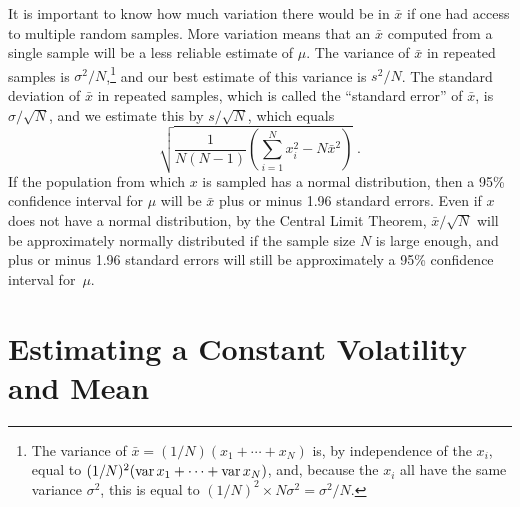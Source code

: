 It is important to know how much variation there would be in $\bar{x}$ if one had access to multiple random samples.  More variation means that an $\bar{x}$ computed from a single sample will be a less reliable estimate of $\mu$.  The variance of $\bar{x}$ in repeated samples is $\sigma^2/N$,\footnote{The variance of $\bar{x} = (1/N)(x_1 + \cdots + x_N)$ is, by independence of the $x_i$, equal to $(1/N)^2(\operatorname{var}{x_1} + \cdots + \operatorname{var}{x_N})$, and, because the $x_i$ all have the same variance $\sigma^2$, this is equal to $(1/N)^2 \times N\sigma^2 = \sigma^2/N$.} and our best estimate of this variance is $s^2/N$.  The standard deviation of $\bar{x}$ in repeated samples, which is called the ``standard error'' of  $\bar{x}$, is $\sigma/\sqrt{N}$, and we estimate this by $s/\sqrt{N}$, which equals
$$\sqrt{\frac{1}{N(N-1)}\left(\sum_{i=1}^{N} x_i^2-N\bar{x}^2\right)}\; .$$
If the population from which $x$ is sampled has a normal distribution, then a 95\% confidence interval for $\mu$ will be $\bar{x}$ plus or minus 1.96 standard errors.  Even if $x$ does not have a normal distribution, by the Central Limit Theorem, $\bar{x}/\sqrt{N}$ will be approximately normally distributed if the sample size $N$ is large enough, and plus or minus 1.96 standard errors will still be approximately a 95\% confidence interval for~$\mu$. 

\section{Estimating a Constant Volatility and Mean}\label{s_estimatingvolatility}

